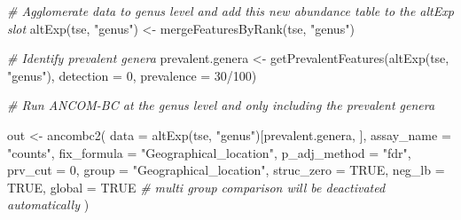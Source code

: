 \documentclass[
]{book}
\newenvironment{Shaded}{\begin{snugshade}}{\end{snugshade}}
\newcommand{\AttributeTok}[1]{\textcolor[rgb]{0.77,0.63,0.00}{#1}}
\newcommand{\CommentTok}[1]{\textcolor[rgb]{0.56,0.35,0.01}{\textit{#1}}}
\newcommand{\ConstantTok}[1]{\textcolor[rgb]{0.00,0.00,0.00}{#1}}
\newcommand{\DecValTok}[1]{\textcolor[rgb]{0.00,0.00,0.81}{#1}}
\newcommand{\FunctionTok}[1]{\textcolor[rgb]{0.00,0.00,0.00}{#1}}
\newcommand{\NormalTok}[1]{#1}
\newcommand{\OtherTok}[1]{\textcolor[rgb]{0.56,0.35,0.01}{#1}}
\newcommand{\SpecialCharTok}[1]{\textcolor[rgb]{0.00,0.00,0.00}{#1}}
\newcommand{\StringTok}[1]{\textcolor[rgb]{0.31,0.60,0.02}{#1}}
\begin{document}
\begin{Shaded}
\begin{Highlighting}[]
\CommentTok{\# Agglomerate data to genus level and add this new abundance table to the altExp slot}
\FunctionTok{altExp}\NormalTok{(tse, }\StringTok{"genus"}\NormalTok{) }\OtherTok{\textless{}{-}} \FunctionTok{mergeFeaturesByRank}\NormalTok{(tse, }\StringTok{"genus"}\NormalTok{)}

\CommentTok{\# Identify prevalent genera}
\NormalTok{prevalent.genera }\OtherTok{\textless{}{-}} \FunctionTok{getPrevalentFeatures}\NormalTok{(}\FunctionTok{altExp}\NormalTok{(tse, }\StringTok{"genus"}\NormalTok{), }\AttributeTok{detection =} \DecValTok{0}\NormalTok{, }\AttributeTok{prevalence =} \DecValTok{30}\SpecialCharTok{/}\DecValTok{100}\NormalTok{)}

\CommentTok{\# Run ANCOM{-}BC at the genus level and only including the prevalent genera}

\NormalTok{out }\OtherTok{\textless{}{-}} \FunctionTok{ancombc2}\NormalTok{(}
  \AttributeTok{data =} \FunctionTok{altExp}\NormalTok{(tse, }\StringTok{"genus"}\NormalTok{)[prevalent.genera, ],}
  \AttributeTok{assay\_name =} \StringTok{"counts"}\NormalTok{, }
  \AttributeTok{fix\_formula =} \StringTok{"Geographical\_location"}\NormalTok{, }
  \AttributeTok{p\_adj\_method =} \StringTok{"fdr"}\NormalTok{, }
  \AttributeTok{prv\_cut =} \DecValTok{0}\NormalTok{,}
  \AttributeTok{group =} \StringTok{"Geographical\_location"}\NormalTok{, }
  \AttributeTok{struc\_zero =} \ConstantTok{TRUE}\NormalTok{, }
  \AttributeTok{neg\_lb =} \ConstantTok{TRUE}\NormalTok{,}
  \AttributeTok{global =} \ConstantTok{TRUE} \CommentTok{\# multi group comparison will be deactivated automatically }
\NormalTok{)}
\end{Highlighting}
\end{Shaded}

\begin{Shaded}
\end{Shaded}
\end{document}

